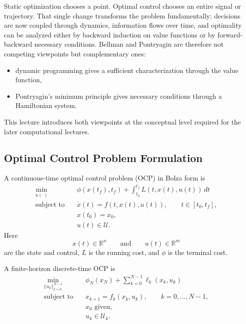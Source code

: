 \label{lec:l4}

\begin{intuition}
	Static optimization chooses a point. Optimal control chooses an entire signal or trajectory. That single change transforms the problem fundamentally: decisions are now coupled through dynamics, information flows over time, and optimality can be analyzed either by backward induction on value functions or by forward-backward necessary conditions. Bellman and Pontryagin are therefore not competing viewpoints but complementary ones:
	\begin{itemize}
		\item dynamic programming gives a sufficient characterization through the value function,
		\item Pontryagin's minimum principle gives necessary conditions through a Hamiltonian system.
	\end{itemize}
	This lecture introduces both viewpoints at the conceptual level required for the later computational lectures.
\end{intuition}

\subsection{Optimal Control Problem Formulation}
\label{sec:l4-optimal-control-problem-formulation}

\begin{definition}\label{def:l4-continuous-time-optimal-control-problem-in-bolza-form}
	A continuous-time optimal control problem (OCP) in Bolza form is
	\begin{align*}
		\min_{u(\cdot)} \quad & \phi(x(t_f),t_f) + \int_{t_0}^{t_f} L(t,x(t),u(t))\,dt \\
		\text{subject to}\quad & \dot x(t)=f(t,x(t),u(t)), \qquad t \in [t_0,t_f], \\
		                       & x(t_0)=x_0, \\
		                       & u(t)\in \mathcal{U}.
	\end{align*}
	Here
	\[
		x(t)\in \mathbb{R}^n
		\qquad \text{and} \qquad
		u(t)\in \mathbb{R}^m
	\]
	are the state and control, $L$ is the running cost, and $\phi$ is the terminal cost.
\end{definition}

\begin{definition}\label{def:l4-discrete-time-optimal-control-problem}
	A finite-horizon discrete-time OCP is
	\begin{align*}
		\min_{\{u_k\}_{k=0}^{N-1}} \quad & \phi_N(x_N) + \sum_{k=0}^{N-1} \ell_k(x_k,u_k) \\
		\text{subject to}\quad & x_{k+1}=f_k(x_k,u_k), \qquad k=0,\dots,N-1, \\
		                       & x_0 \text{ given}, \\
		                       & u_k \in \mathcal{U}_k.
	\end{align*}
\end{definition}

